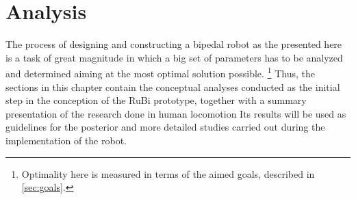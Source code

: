 \chapter{Analysis} %
\label{cha:analysis}
The process of designing and constructing a bipedal robot as the presented here is a task of great magnitude in which a big set of parameters has to be analyzed and determined aiming at the most optimal solution possible. \footnote{Optimality here is measured in terms of the aimed goals, described in \ref{sec:goals}.}
Thus, the sections in this chapter contain the conceptual analyses conducted as the initial step in the conception of the RuBi prototype, together with a summary presentation of the research done in human locomotion 
Its results will be used as guidelines for the posterior and more detailed studies carried out during the implementation of the robot.






